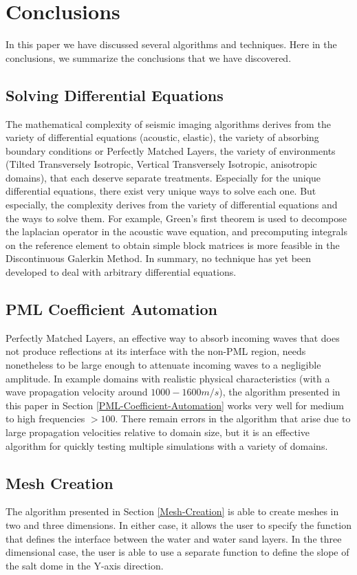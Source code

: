 \newpage
\section{Conclusions}

In this paper we have discussed several algorithms and techniques. Here in the conclusions, we summarize the conclusions that we have discovered.

\subsection{Solving Differential Equations}

The mathematical complexity of seismic imaging algorithms derives from the variety of differential equations (acoustic, elastic), the variety of absorbing boundary conditions or Perfectly Matched Layers, the variety of environments (Tilted Transversely Isotropic, Vertical Transversely Isotropic, anisotropic domains), that each deserve separate treatments. Especially for the unique differential equations, there exist very unique ways to solve each one. But especially, the complexity derives from the variety of differential equations and the ways to solve them. For example, Green's first theorem is used to decompose the laplacian operator in the acoustic wave equation, and precomputing integrals on the reference element to obtain simple block matrices is more feasible in the Discontinuous Galerkin Method. In summary, no technique has yet been developed to deal with arbitrary differential equations. 


\subsection{PML Coefficient Automation}

Perfectly Matched Layers, an effective way to absorb incoming waves that does not produce reflections at its interface with the non-PML region, needs nonetheless to be large enough to attenuate incoming waves to a negligible amplitude. In example domains with realistic physical characteristics (with a wave propagation velocity around $1000-1600 m/s$), the algorithm presented in this paper in Section \ref{PML-Coefficient-Automation} works very well for medium to high frequencies $> 100$. There remain errors in the algorithm that arise due to large propagation velocities relative to domain size, but it is an effective algorithm for quickly testing multiple simulations with a variety of domains.


\subsection{Mesh Creation}

The algorithm presented in Section \ref{Mesh-Creation} is able to create meshes in two and three dimensions. In either case, it allows the user to specify the function that defines the interface between the water and water sand layers. In the three dimensional case, the user is able to use a separate function to define the slope of the salt dome in the Y-axis direction.









